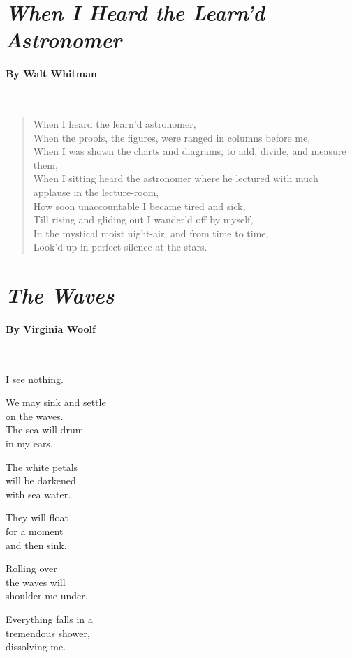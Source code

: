 \documentclass[12pt, openany, letterpaper]{memoir}
\begin{document}
\mainmatter

\section*{\emph{When I Heard the Learn'd Astronomer}}
\paragraph{By Walt Whitman}~

\begin{verse}	
	When I heard the learn’d astronomer,\\	
	When the proofs, the figures, were ranged in columns before me,\\	
	When I was shown the charts and diagrams, to add, divide, and measure them,\\	
	When I sitting heard the astronomer where he lectured with much applause in the lecture-room,\\	
	How soon unaccountable I became tired and sick,\\	
	Till rising and gliding out I wander’d off by myself,\\	
	In the mystical moist night-air, and from time to time,\\	
	Look’d up in perfect silence at the stars.
\end{verse}

\newpage
{}
\section*{\emph{The Waves}}
\paragraph{By Virginia Woolf}~

\vspace{1em}
\begin{minipage}{0.3\textwidth}
\begin{center}
	I see nothing.
	
	We may sink and settle\\
	on the waves.\\
	The sea will drum\\
	in my ears.
	
	The white petals\\
	will be darkened\\
	with sea water.
	
	They will float\\
	for a moment\\
	and then sink.
	
	Rolling over\\
	the waves will\\
	shoulder me under.
	
	Everything falls in a\\
	tremendous shower,\\
	dissolving me.
\end{center}
\end{minipage}
\end{document}
